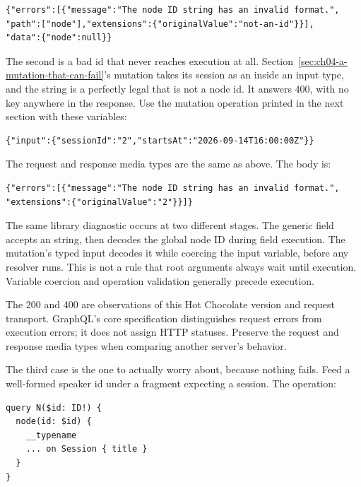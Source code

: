 \begin{verbatim}
{"errors":[{"message":"The node ID string has an invalid format.",
"path":["node"],"extensions":{"originalValue":"not-an-id"}}],
"data":{"node":null}}
\end{verbatim}

%
The second is a bad id that never reaches execution at all.
Section~\ref{sec:ch04-a-mutation-that-can-fail}'s mutation takes its session
as an  inside an input type, and the string  is a perfectly
legal  that is not a node id. It answers 400, with no  key
anywhere in the response. Use the mutation operation printed in the next
section with these variables:

\begin{verbatim}
{"input":{"sessionId":"2","startsAt":"2026-09-14T16:00:00Z"}}
\end{verbatim}

The request and response media types are the same as above. The body is:

\begin{verbatim}
{"errors":[{"message":"The node ID string has an invalid format.",
"extensions":{"originalValue":"2"}}]}
\end{verbatim}

The same library diagnostic occurs at two different stages. The generic
 field accepts an  string, then decodes the global node
ID during field execution. The mutation's typed \code{[ID<Session>]} input
decodes it while coercing the input variable, before any resolver runs.
This is not a rule that root arguments always wait until execution. Variable
coercion and operation validation generally precede execution.

The 200 and 400 are observations of this Hot Chocolate version and request
transport. GraphQL's core specification distinguishes request errors from
execution errors; it does not assign HTTP statuses. Preserve the request and
response media types when comparing another server's behavior.

%
%
The third case is the one to actually worry about, because nothing fails.
Feed  a well-formed speaker id under a fragment expecting a
session. The operation:

\begin{verbatim}
query N($id: ID!) {
  node(id: $id) {
    __typename
    ... on Session { title }
  }
}
\end{verbatim}

